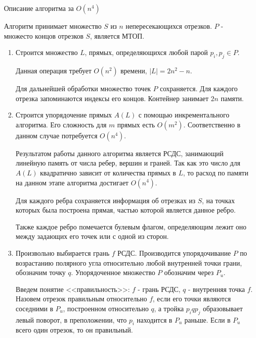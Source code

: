 \documentclass[letterpaper,12pt]{article}
\begin{document}
\begin{center}
Описание алгоритма за $O(n^4)$
\end{center}

Алгоритм принимает множество $S$ из $n$ непересекающихся отрезков.
$P$ - множесто концов отрезков $S$, является МТОП.
\begin{enumerate}
      \item Строится множество $L$, прямых, определяющихся любой парой 
            $p_i, p_j \in P$.
            
            Данная операция требует $O(n^2)$ времени, $|L| = 2n^2-n$.
            
            Для дальнейшей обработки множество точек $P$ сохраняется.
            Для каждого отрезка запоминаются индексы его концов.
            Контейнер занимает $2n$ памяти.
      \item Строится упорядочение прямых $A(L)$ с помощью 
            инкрементального алгоритма. Его сложность для $m$ прямых есть 
            \hyperlink{literature_1}{$O(m^2)$}. Соответственно в данном 
            случае потребуется $O(n^4)$.
            
            Результатом работы данного алгоритма является РСДС,
            занимающий линейную память от числа ребер, вершин и граней.
            Так как это число для $A(L)$ квадратично зависит от количества
            прямых в $L$, то расход по памяти на данном этапе алгоритма 
            достигает $O(n^4)$.

            Для каждого ребра сохраняется информация об отрезках из $S$,
            на точках которых была построена прямая, частью которой 
            является данное ребро. 
            
            Также каждое ребро помечается булевым флагом, определяющим 
            лежит оно между задающих его точек или с одной из сторон.
      \item Произвольно выбирается грань $f$ РСДС. Производится
            упорядочивание $P$ по возрастанию полярного угла
            относительно любой внутренней точки грани, обозначим
            точку $q$. Упорядоченное множество $P$ обозначим через $P_u$.
            
            Введем понятие <<правильность>>:
            $f$ - грань РСДС, $q$ - внутренняя точка $f$.
            Назовем отрезок правильным относительно $f$, если 
            его точки являются соседними в $P_u$, построенном относительно
            $q$, а тройка $p_i q p_j$ образовывает левый поворот, 
            в преположении, что $p_i$ находится в $P_u$ раньше.
            Если в $P_u$ всего один отрезок, то он правильный.


\end{enumerate}
\end{document}
